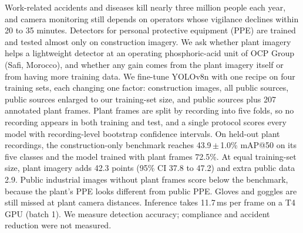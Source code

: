 Work-related accidents and diseases kill nearly three million people each year, and camera monitoring still depends on operators whose vigilance declines within 20 to 35 minutes. Detectors for personal protective equipment (PPE) are trained and tested almost only on construction imagery. We ask whether plant imagery helps a lightweight detector at an operating phosphoric-acid unit of OCP Group (Safi, Morocco), and whether any gain comes from the plant imagery itself or from having more training data. We fine-tune YOLOv8n with one recipe on four training sets, each changing one factor: construction images, all public sources, public sources enlarged to our training-set size, and public sources plus 207 annotated plant frames. Plant frames are split by recording into five folds, so no recording appears in both training and test, and a single protocol scores every model with recording-level bootstrap confidence intervals. On held-out plant recordings, the construction-only benchmark reaches 43.9\,$\pm$\,1.0\% mAP@50 on its five classes and the model trained with plant frames 72.5\%. At equal training-set size, plant imagery adds 42.3 points (95\% CI 37.8 to 47.2) and extra public data 2.9. Public industrial images without plant frames score below the benchmark, because the plant's PPE looks different from public PPE. Gloves and goggles are still missed at plant camera distances. Inference takes 11.7\,ms per frame on a T4 GPU (batch 1). We measure detection accuracy; compliance and accident reduction were not measured.
